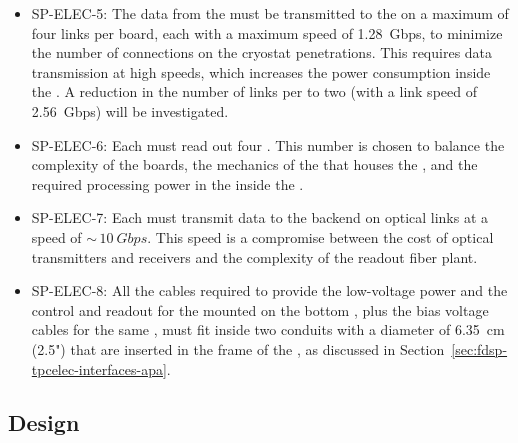 \begin{itemize}
\item SP-ELEC-5: The data from the  must be transmitted to the
 on a maximum of four links per board, each with a maximum
speed of \SI{1.28}{Gbps}, to minimize
the number of connections on the cryostat penetrations. This 
requires data transmission at high speeds, which 
increases the power consumption inside the .
A reduction in the number of links per  to two
(with a link speed of \SI{2.56}{Gbps}) will be investigated.

\item SP-ELEC-6: Each  must read out four . This number
is chosen to balance the complexity of the boards, the mechanics
of the  that houses the , and the 
required processing power in the  inside the
.

\item SP-ELEC-7: Each  must transmit data to the 
backend on optical links at a speed of $\sim\,\SI{10}{Gbps}$. This speed 
is a compromise between the cost of optical transmitters and
receivers and the complexity of the readout fiber plant.

\item SP-ELEC-8: All the cables required to provide the low-voltage power
and the control and readout for the  mounted on
the bottom , plus the bias voltage cables for
the same , must fit inside two conduits with a
diameter of \SI{6.35}{cm} (2.5") that are inserted in the frame of
the , as discussed in Section~\ref{sec:fdsp-tpcelec-interfaces-apa}. 
\end{itemize}

\subsection{Design}
\label{sec:fdsp-tpcelec-overview-design}

